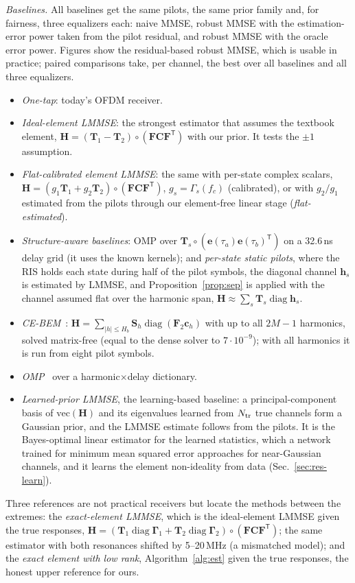 \documentclass[conference,10pt]{IEEEtran}
\theoremstyle{remark}
\DeclareMathOperator{\diag}{diag}
\newcommand{\T}{\mathsf T}
\begin{document}
\emph{Baselines.} All baselines get the same pilots, the same prior family and, for fairness, three equalizers each:
naive MMSE, robust MMSE with the estimation-error power taken from the pilot residual, and robust MMSE with the
oracle error power. Figures show the residual-based robust MMSE, which is usable in practice; paired comparisons
take, per channel, the best over all baselines and all three equalizers.
\begin{itemize}
\item \emph{One-tap}: today's OFDM receiver.
\item \emph{Ideal-element LMMSE}: the strongest estimator that assumes the textbook element, $\bm H=(\bm T_1-\bm T_2)\circ
(\bm F\bm C\bm F^{\T})$ with our prior. It tests the $\pm1$ assumption.
\item \emph{Flat-calibrated element LMMSE}: the same with per-state complex scalars, $\bm H=(g_1\bm T_1+g_2\bm T_2)\circ
(\bm F\bm C\bm F^{\T})$, $g_s=\Gamma_s(f_c)$ (calibrated), or with $g_2/g_1$ estimated from the pilots through our
element-free linear stage (\emph{flat-estimated}).
\item \emph{Structure-aware baselines}: OMP over $\bm T_s\circ(\bm e(\tau_a)\bm e(\tau_b)^{\T})$ on a 32.6\,ns delay grid
(it uses the known kernels); and \emph{per-state static pilots}, where the RIS holds each state during half of the pilot
symbols, the diagonal channel $\bm h_s$ is estimated by LMMSE, and Proposition~\ref{prop:sep} is applied with the channel
assumed flat over the harmonic span, $\bm H\approx\sum_s\bm T_s\diag\bm h_s$.
\item \emph{CE-BEM}~\cite{tang2007}: $\bm H=\sum_{|h|\le H_b}\bm S_h\diag(\bm F_2\bm c_h)$ with up to all $2M-1$
harmonics, solved matrix-free (equal to the dense solver to $7\cdot10^{-9}$); with all harmonics it is run from eight
pilot symbols.
\item \emph{OMP}~\cite{tropp2007} over a harmonic$\times$delay dictionary.
\item \emph{Learned-prior LMMSE}, the learning-based baseline: a principal-component basis of $\mathrm{vec}(\bm H)$ and its
eigenvalues learned from $N_{\rm tr}$ true channels form a Gaussian prior, and the LMMSE estimate follows from the pilots.
It is the Bayes-optimal linear estimator for the learned statistics, which a network trained for minimum mean squared
error approaches for near-Gaussian channels, and it learns the element non-ideality from data (Sec.~\ref{sec:res-learn}).
\end{itemize}
\vspace{-1ex}
Three references are not practical receivers but locate the methods between the extremes: the \emph{exact-element
LMMSE}, which is the ideal-element LMMSE given the true responses, $\bm H=(\bm T_1\diag\bm\Gamma_1+\bm T_2\diag\bm\Gamma_2)
\circ(\bm F\bm C\bm F^{\T})$; the same estimator with both resonances shifted by 5--20\,MHz (a mismatched model); and the
\emph{exact element with low rank}, Algorithm~\ref{alg:est} given the true responses, the honest upper reference for ours.
\end{document}
